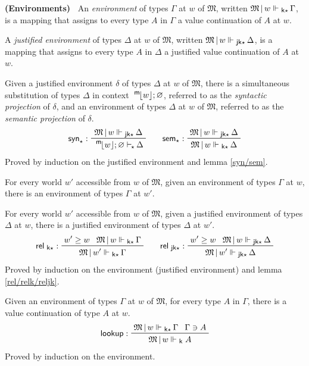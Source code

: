 \documentclass{entcs}
\numberwithin{equation}{thm}
\newcommand{\tsf}[1]{\textsf{\upshape{#1}}}
\newcommand{\stsf}[1]{\smash{\tsf{\small{#1}}}}
\renewcommand{\:}{\mathrel{:}}
\newcommand{\tyrule}[1]{\prftree[l]{${#1} \:\,$}}
\newcommand{\0}{\varnothing}
\newcommand{\es}{\mathrel{\vdash_{\mkern-2mu\star\mkern-2mu}}}
\newcommand{\M}{\mathfrak{M}}
\newcommand{\Mover}{\M\,|\,}
\newcommand{\mpeek}[1]{\mathopen{^{\stsf{m}\mkern-3mu}\lfloor}{#1}\mathclose{\rfloor}}
\newcommand{\eek}{\mathrel{\Vdash_{\stsf{k}}}}
\newcommand{\eeks}{\mathrel{\Vdash_{\stsf{k}\star\mkern-2mu}}}
\newcommand{\eejks}{\mathrel{\Vdash_{\stsf{jk}\star\mkern-2mu}}}
\newcommand{\syns}{\operatorname{\tsf{syn}_{\star}}}
\newcommand{\sems}{\operatorname{\tsf{sem}_{\star}}}
\newcommand{\relks}{\operatorname{\tsf{rel}_{\stsf{k}\star}}}
\newcommand{\reljks}{\operatorname{\tsf{rel}_{\stsf{jk}\star}}}
\newcommand{\lookup}{\operatorname{\tsf{lookup}}}
\begin{document}
\begin{definition}
  \textbf{(Environments)\ }
  \label{eeks/eejks}
  An \emph{environment} of types $\Gamma$ at $w$ of $\M$, written $\Mover w \eeks \Gamma$, is a mapping that assigns to every type $A$ in $\Gamma$ a value continuation of $A$ at $w$.
  
  A \emph{justified environment} of types $\Delta$ at $w$ of $\M$, written $\Mover w \eejks \Delta$, is a mapping that assigns to every type $A$ in $\Delta$ a justified value continuation of $A$ at $w$.
\end{definition}

\begin{lemma}
  \normalshape
  \label{syns/sems}
  Given a justified environment $\delta$ of types $\Delta$ at $w$ of $\M$, there is a simultaneous substitution of types $\Delta$ in context $\mpeek{w}; \0$, referred to as the \emph{syntactic projection} of $\delta$, and an environment of types $\Delta$ at $w$ of $\M$, referred to as the \emph{semantic projection} of $\delta$.
  \begin{gather*}
    \tyrule{\syns}{\Mover w \eejks \Delta}{\mpeek{w}; \0 \es \Delta}\qquad
    \tyrule{\sems}{\Mover w \eejks \Delta}{\Mover w \eeks \Delta}
  \end{gather*}
  Proved by induction on the justified environment and lemma \ref{syn/sem}.
\end{lemma}

\begin{lemma}
  \normalshape
  \label{relks/reljks}
  For every world $w'$ accessible from $w$ of $\M$, given an environment of types $\Gamma$ at $w$, there is an environment of types $\Gamma$ at $w'$.
  
  For every world $w'$ accessible from $w$ of $\M$, given a justified environment of types $\Delta$ at $w$, there is a justified environment of types $\Delta$ at $w'$.
  \begin{gather*}
    \tyrule{\relks}{w' \ge w}{\Mover w \eeks \Gamma}{\Mover w' \eeks \Gamma}\qquad
    \tyrule{\reljks}{w' \ge w}{\Mover w \eejks \Delta}{\Mover w' \eejks \Delta}
  \end{gather*}
  Proved by induction on the environment (justified environment) and lemma \ref{rel/relk/reljk}.
\end{lemma}

\begin{lemma}
  \normalshape
  \label{lookup}
  Given an environment of types $\Gamma$ at $w$ of $\M$, for every type $A$ in $\Gamma$, there is a value continuation of type $A$ at $w$.
  \begin{gather*}
    \tyrule{\lookup}{\Mover w \eeks \Gamma}{\Gamma \ni A}{\Mover w \eek A}
  \end{gather*}
  Proved by induction on the environment.
\end{lemma}
\end{document}
